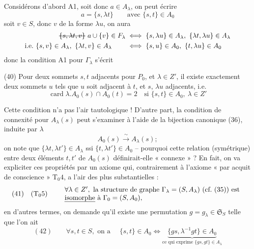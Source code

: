 \documentclass[11pt,a4paper]{article}
\begin{document}
Considérons d'abord A1, soit donc  $a \in A_\lambda$, on peut écrire
\[
a = \{s, \lambda t\} \qquad \text{avec } \{s, t\} \in A_0
\]
soit $v \in S$, donc $v$ de la forme $\lambda u$, on aura
\[
\begin{aligned}
\text{\struck{$\{s, \lambda t, v\}$}}\ a \cup \{v\} \in F_\lambda
&\iff \{s, \lambda u\} \in A_\lambda, \ \{\lambda t, \lambda u\} \in A_\lambda \\
\text{i.e.\ } \{s, v\} \in A_\lambda, \ \{\lambda t, v\} \in A_\lambda \qquad
&\iff \{s, u\} \in A_0, \ \{t, \lambda u\} \in A_0
\end{aligned}
\]
donc la condition A1 pour $\Gamma_\lambda$ s'écrit

(40) Pour deux sommets $s, t$ adjacents pour $P_0$, et $\lambda \in Z'$, il existe exactement deux sommets $u$ tels que  $u$ soit adjacent à $t$, et $s$, $\lambda u$ adjacents, i.e.
\[
\operatorname{card} \lambda . A_0(s) \cap A_0(t) = 2 \quad \text{si } \{s, t\} \in A_0, \ \lambda \in Z'
\]

Cette condition n'a pas l'air tautologique ! D'autre part, la condition de connexité pour $A_\lambda(s)$ peut s'examiner à l'aide de la bijection canonique (36), induite par $\lambda$
\[
A_0(s) \xrightarrow{\ \sim\ } A_\lambda(s) ;
\]
on note que $\{\lambda t, \lambda t'\} \in A_\lambda$ ssi $\{t, \lambda t'\} \in A_0$ -- pourquoi cette relation (symétrique) entre deux éléments $t, t'$ de $A_0(s)$ définirait-elle « connexe » ? En fait, on va expliciter ces propriétés par un axiome qui, contrairement à l'axiome « par acquit de conscience » $\text{T}_0 4$, a l'air des plus substantielles :
\[
(41) \quad (\text{T}_0 5) \qquad
\begin{array}{l}
\forall \lambda \in Z', \text{ la structure de graphe } \Gamma_\lambda = (S, A_\lambda) \text{ (cf.\ (35)) est} \\
\text{\emph{isomorphe} à } \Gamma_0 = (S, A_0),
\end{array}
\]
en d'autres termes, on demande qu'il existe une permutation $g = g_\lambda \in \mathfrak{S}_S$ telle que l'on ait
\[
(42) \qquad \forall s, t \in S, \text{ on a } \quad
\{s, t\} \in A_0 \iff
\underbrace{\{g s, \lambda^{-1} g t\} \in A_0}_{\text{ce qui exprime } \{g s, g t\} \in A_\lambda}
\]
\end{document}
